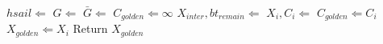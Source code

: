\documentclass[12pt]{article}
\begin{document}
\begin{CJK}{UTF8}{bkai}
\begin{algorithm}[h]
\begin{algorithmic}[1]
                  \State $hsail \Leftarrow$ 
                  \label{line:tohsail}
                  \State $G \Leftarrow$ 
                  \label{line:trans}
                  \State $\bar{G} \Leftarrow$ 
                  \label{line:trane}
                  \State $C_{golden} \Leftarrow  \infty$
                  \label{line:optstart}
                    \label{line:forlambda}
                    \State $X_{inter}, bt_{remain} \Leftarrow$ 
                    \State $X_i, C_i \Leftarrow$ 
                      \State $C_{golden} \Leftarrow C_i$
                      \State $X_{golden} \Leftarrow X_i$
                    \EndIf
                  \EndFor
                  \State Return $X_{golden}$
                  \label{line:optend}
              \end{algorithmic}
              \label{alg:framework}
            \end{algorithm}


\end{CJK}
\end{document}
